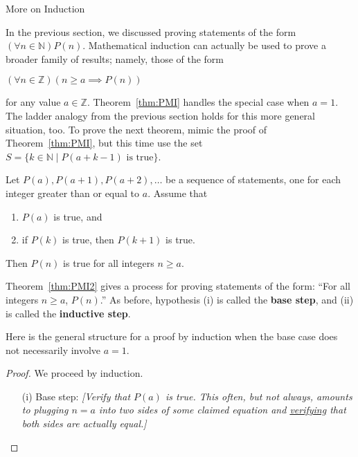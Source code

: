 \begin{section}{More on Induction}

In the previous section, we discussed proving statements of the form $(\forall n \in \mathbb{N}) P(n)$. Mathematical induction can actually be used to prove a broader family of results; namely, those of the form
\begin{center}
$(\forall n \in \mathbb{Z})(n \geq a \implies P(n))$
\end{center}
for any value $a \in \mathbb{Z}$. Theorem~\ref{thm:PMI} handles the special case when $a = 1$.  The ladder analogy from the previous section holds for this more general situation, too. To prove the next theorem, mimic the proof of Theorem~\ref{thm:PMI}, but this time use the set $S=\{k\in \mathbb{N}\mid P(a+k-1) \text{ is true}\}$.

\begin{theorem}\label{thm:PMI2}
Let $P(a), P(a+1), P(a+2), \ldots$ be a sequence of statements, one for each integer greater than or equal to $a$. Assume that
\begin{enumerate}[label=\textrm{(\roman*)}]
\item $P(a)$ is true, and
\item if $P(k)$ is true, then $P(k+1)$ is true.
\end{enumerate}
Then $P(n)$ is true for all integers $n \geq a$.
\end{theorem}

Theorem~\ref{thm:PMI2} gives a process for proving statements of the form: ``For all integers $n\geq a$, $P(n)$.'' As before, hypothesis (i) is called the \textbf{base step}, and (ii) is called the \textbf{inductive step}.

\begin{skeleton}
Here is the general structure for a proof by induction when the base case does not necessarily involve $a=1$.

\begin{mdframed}[style=skeleton]
\begin{proof}
We proceed by induction.
\begin{enumerate}\setlength{\itemsep}{0in}
\item[(i)] Base step: \emph{[Verify that $P(a)$ is true. This often, but not always, amounts to plugging $n=a$ into two sides of some claimed equation and \underline{verifying} that both sides are actually equal.]}


\end{enumerate}
\end{proof}
\end{mdframed}
\end{skeleton}
\end{section}

